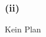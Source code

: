 \documentclass[10pt,a4paper]{article}
\begin{document}
\subsubsection*{\textbf{(ii)}}
Kein Plan
%
\end{document}
